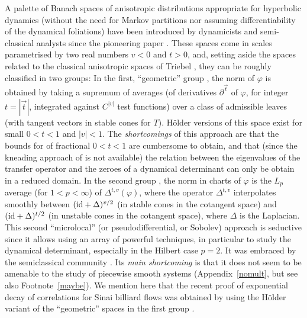\documentclass[10pt,twoside]{amsart}
\begin{document}
A palette of  Banach spaces of anisotropic distributions appropriate for hyperbolic
dynamics (without the need for Markov partitions nor assuming differentiability
of the dynamical foliations) have been introduced
by dynamicists and semi-classical analysts since the pioneering paper
\cite{BKL}. These spaces come in
scales parametrised by two real numbers $v<0$ and $t>0$,  and, setting aside  the spaces
related to the
classical anisotropic spaces of Triebel \cite{Tr}, they can be roughly classified in two groups: In the first, ``geometric''
group \cite{BKL, GL1}, the norm of $\varphi$  is obtained by taking a supremum of averages (of derivatives $\partial^{\vec t}$
of $\varphi$, for integer $t=|\vec t|$, integrated  against
$C^{|v|}$ test functions) over a class of admissible
leaves (with tangent vectors in stable cones for $T$).
H\"older versions of this space exist \cite{DL,DZ} for  small  $0<t<1$ and $|v|<1$. 
The {\it shortcomings} of this approach are that the bounds for of fractional $0<t<1$ are cumbersome
to obtain, and that (since the kneading approach of \cite{BaRu, BT2} is not available) the relation between the eigenvalues of the transfer
operator and the zeroes of a dynamical determinant can only be obtain in a reduced domain.
In the second group 
\cite{BT1}, the norm in charts of $\varphi$ is the $L_p$ average (for $1<p<\infty$) of $\Delta^{t,v}(\varphi)$,
where the operator $\Delta^{t,v}$ interpolates smoothly 
between $(\mathrm{id} +\Delta)^{v/2}$ (in stable cones in the cotangent space) and $(\mathrm{id} +\Delta)^{t/2}$ (in unstable cones
in the cotangent space), where  $\Delta$ is the Laplacian.
This second ``microlocal'' (or pseudodifferential, or Sobolev) approach is seductive since it
allows using an array of powerful techniques, in particular to study the dynamical determinant, especially
 in the Hilbert case $p=2$. It
  was embraced by the semiclassical community
\cite{FRS}. Its {\it main shortcoming} is that it does not seem to be amenable to the study of piecewise
smooth systems (Appendix~\ref{nomult}, but see also Footnote~\ref{maybe}).
 We mention here that the recent proof \cite{BDL} of exponential decay of correlations
for Sinai billiard flows was obtained by using the H\"older variant of the ``geometric'' spaces in the first group
\cite{DL, DZ}. 
\end{document}
